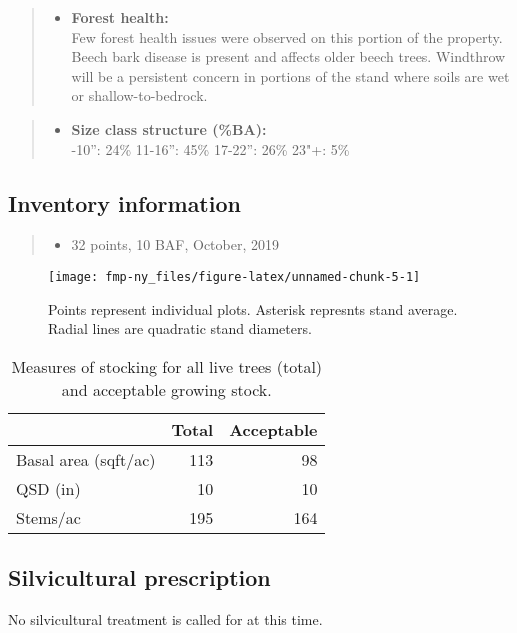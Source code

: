 \documentclass[]{tufte-handout}
\providecommand{\tightlist}{%
  \setlength{\itemsep}{0pt}\setlength{\parskip}{0pt}}
\begin{document}
\begin{quote}
\begin{itemize}
\tightlist
\item
  \textbf{Forest health:}\\
  \vspace{2pt} Few forest health issues were observed on this portion of
  the property. Beech bark disease is present and affects older beech
  trees. Windthrow will be a persistent concern in portions of the stand
  where soils are wet or shallow-to-bedrock.
\end{itemize}
\end{quote}

\begin{quote}
\begin{itemize}
\tightlist
\item
  \textbf{Size class structure (\%BA):}\\
  \vspace{2pt} -10'': 24\% \textbar{} 11-16'': 45\% \textbar{}
  17-22'': 26\% \textbar{} 23"+: 5\%
\end{itemize}
\end{quote}

\subsection{Inventory information}\label{inventory-information}

\begin{quote}
\begin{itemize}
\tightlist
\item
  32 points, 10 BAF, October, 2019
\end{itemize}
\end{quote}

\begin{figure}
\texttt{[image: fmp-ny\_files/figure-latex/unnamed-chunk-5-1]} \caption[Points represent individual plots]{Points represent individual plots. Asterisk represnts stand average. Radial lines are quadratic stand diameters.}\label{fig:unnamed-chunk-5}
\end{figure}

\begin{table}

\caption{\label{tab:unnamed-chunk-6}Measures of stocking for all live trees (total) and acceptable 
      growing stock.}
\centering
\begin{tabular}[t]{lrr}
\toprule
  & Total & Acceptable\\
\midrule
Basal area (sqft/ac) & 113 & 98\\
QSD (in) & 10 & 10\\
Stems/ac & 195 & 164\\
\bottomrule
\end{tabular}
\end{table}

\subsection{Silvicultural
prescription}\label{silvicultural-prescription}

No silvicultural treatment is called for at this time.

\newpage
\end{document}
